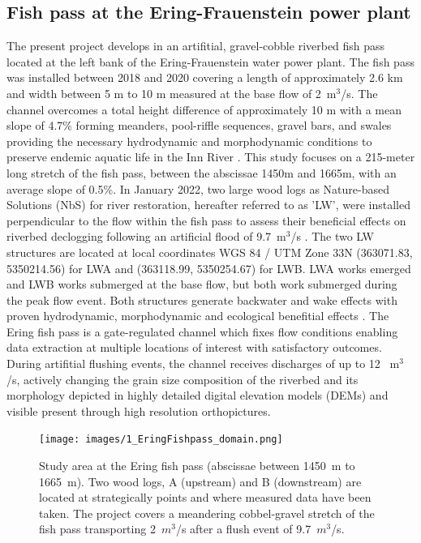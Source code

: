 \documentclass[draft,linenumbers,onecolumn]{agujournal2019} %
\begin{document}
\subsection{Fish pass at the Ering-Frauenstein power plant}
\label{subsec:Sec2.1 }
The present project develops in an artifitial, gravel-cobble riverbed fish pass located at the left bank of the Ering-Frauenstein water power plant. The fish pass was installed between 2018 and 2020 covering a length of approximately 2.6 km  and width between 5 m to 10 m measured at the base flow of  2~m$^3$/s. The channel overcomes a total height difference of approximately 10 m with a mean slope of 4.7\% forming meanders, pool-riffle sequences, gravel bars, and swales providing the necessary hydrodynamic and morphodynamic conditions to preserve endemic aquatic life in the Inn River \cite{schwindt2023fuzzylogic,zauner2020wie}. This study focuses on a 215-meter long stretch of the fish pass, between the abscissae 1450m and 1665m, with an average slope of 0.5\%. In January 2022, two large wood logs as Nature-based Solutions (NbS) for river restoration, hereafter referred to as 'LW', were installed perpendicular to the flow within the fish pass to assess their beneficial effects on riverbed declogging following an artificial flood of 9.7~m$^3$/s  \cite{schwindt2023fuzzylogic}. The two LW structures are located at local coordinates WGS 84 / UTM Zone 33N (363071.83, 5350214.56) for LWA and (363118.99, 5350254.67) for LWB. LWA works emerged and LWB works submerged at the base flow, but both work submerged during the peak flow event. Both structures generate backwater and wake effects with proven  hydrodynamic, morphodynamic and ecological benefitial effects \cite{schalko2021flow,schwindt2023fuzzylogic}.    
The Ering fish pass is a gate-regulated channel which fixes flow conditions enabling data extraction at multiple locations of interest with satisfactory outcomes. During artifitial flushing events, the channel receives discharges of up to 12 ~m$^3$/s, actively changing the grain size composition of the riverbed and its morphology depicted in highly detailed digital elevation models (DEMs) and visible present through high resolution orthopictures.


\begin{figure}[htbp]
	\centering
	\texttt{[image: images/1\_EringFishpass\_domain.png]}
	\caption{Study area  at the Ering fish pass (abscissae between 1450~m to 1665~m). Two wood logs, A (upstream) and B (downstream) are located at strategically points and where measured data have been taken. The project covers a meandering cobbel-gravel stretch of the fish pass transporting 2~$m^3$/s after a flush event of 9.7~$m^3$/s.   
	}
	\label{fig:StudyArea}
\end{figure}
\end{document}
